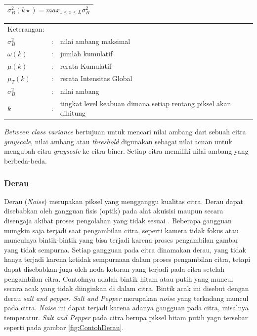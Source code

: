 \begin{table}[H]
	\small
	\begin{adjustbox}{width=1\textwidth}
		\begin{tabular}{|p{13.55cm}|}
			\hline
			\begin{equation} \label{eqn:otsu6}
			\displaystyle
			\sigma_{B}^{2} (k\star)  = max_{1 \leq x \leq L} \sigma_{B}^{2}
			\end{equation} \\
			\hline
		\end{tabular}
	\end{adjustbox}
\end{table}

\noindent
\renewcommand{\arraystretch}{1}
\begin{tabularx}{\textwidth}{lll}
	\hline
	Keterangan: \\
	$\sigma_{B}^{2}$ & : & nilai ambang maksimal\\
	$\omega (k)$ & : & jumlah kumulatif\\
	$\mu (k)$ & : & rerata Kumulatif\\
	$\mu _{T} (k)$ & : & rerata Intensitas Global\\
	$\sigma_{B}^{2}$ & : & nilai ambang\\
	$k$ & : &  tingkat level keabuan  dimana  setiap  rentang  piksel  akan  dihitung\\
	\hline
\end{tabularx}
\vspace{4.5pt}

\textit{Between class variance} bertujuan untuk mencari nilai   ambang dari sebuah citra \textit{grayscale}, nilai ambang atau \textit{threshold} digunakan sebagai nilai acuan untuk mengubah citra \textit{grayscale} ke citra biner. Setiap citra memiliki nilai ambang yang berbeda-beda.
\\

\subsubsection{Derau}
Derau (\textit{Noise}) merupakan piksel yang mengganggu kualitas citra. Derau dapat disebabkan oleh gangguan fisis (optik) pada alat akuisisi maupun secara disengaja akibat proses pengolahan yang tidak sesuai \cite{gonzalez}. Beberapa gangguan mungkin saja terjadi saat pengambilan citra, seperti kamera tidak fokus atau munculnya bintik-bintik yang bisa terjadi karena proses pengambilan gambar yang tidak sempurna. Setiap gangguan pada citra dinamakan derau, yang tidak hanya terjadi karena ketidak sempurnaan dalam proses pengambilan citra, tetapi dapat disebabkan juga oleh noda kotoran yang terjadi pada citra setelah pengambilan citra. Contohnya adalah bintik hitam atau putih yang muncul secara acak yang tidak diinginkan di dalam citra. Bintik acak ini disebut dengan derau \textit{salt and pepper}. \textit{Salt and Pepper} merupakan \textit{noise} yang terkadang muncul pada citra. \textit{Noise} ini dapat terjadi karena adanya gangguan pada citra, misalnya temperatur. \textit{Salt and Pepper} pada citra berupa piksel hitam putih yagn tersebar seperti pada gambar \ref{fig:ContohDerau}.

